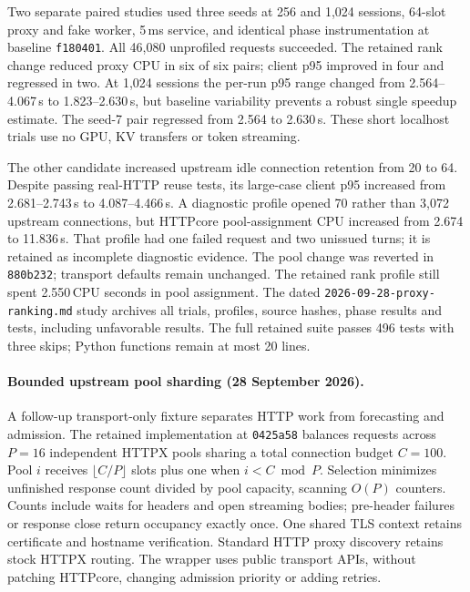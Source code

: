 Two separate paired studies used three seeds at 256 and 1,024 sessions, 64-slot
proxy and fake worker, 5\,ms service, and identical phase instrumentation at
baseline \texttt{f180401}. All 46,080 unprofiled requests succeeded. The retained
rank change reduced proxy CPU in six of six pairs; client p95 improved in four
and regressed in two. At 1,024 sessions the per-run p95 range changed from
2.564--4.067\,s to 1.823--2.630\,s, but baseline variability prevents a robust
single speedup estimate. The seed-7 pair regressed from 2.564 to 2.630\,s.
These short localhost trials use no GPU, KV transfers or token streaming.

The other candidate increased upstream idle connection retention from 20 to 64.
Despite passing real-HTTP reuse tests, its large-case client p95 increased from
2.681--2.743\,s to 4.087--4.466\,s. A diagnostic profile opened 70 rather than
3,072 upstream connections, but HTTPcore pool-assignment CPU increased from
2.674 to 11.836\,s. That profile had one failed request and two unissued turns;
it is retained as incomplete diagnostic evidence. The pool change was reverted
in \texttt{880b232}; transport defaults remain unchanged. The retained rank
profile still spent 2.550\,CPU seconds in pool assignment. The dated
\texttt{2026-09-28-proxy-ranking.md} study archives all trials, profiles, source
hashes, phase results and tests, including unfavorable results. The full retained
suite passes 496 tests with three skips; Python functions remain at most 20 lines.


\paragraph{Bounded upstream pool sharding (28 September 2026).}
A follow-up transport-only fixture separates HTTP work from forecasting and
admission. The retained implementation at \texttt{0425a58} balances requests
across $P=16$ independent HTTPX pools sharing a total connection budget $C=100$.
Pool $i$ receives $\lfloor C/P\rfloor$ slots plus one when $i<C\bmod P$.
Selection minimizes unfinished response count divided by pool capacity, scanning
$O(P)$ counters. Counts include waits for headers and open streaming bodies;
pre-header failures or response close return occupancy exactly once. One shared
TLS context retains certificate and hostname verification. Standard HTTP proxy
discovery retains stock HTTPX routing. The wrapper uses public transport APIs,
without patching HTTPcore, changing admission priority or adding retries.

